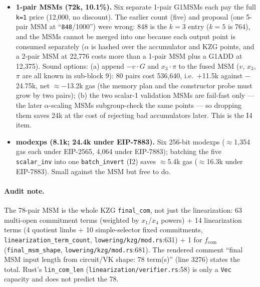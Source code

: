\begin{itemize}[leftmargin=1.4em,itemsep=2pt]
  \item \textbf{1-pair MSMs (72k, 10.1\%).} Six separate 1-pair
        G1MSMs each pay the full \texttt{k=1} price (12{,}000, no
        discount).  The earlier count (five) and
        proposal (one 5-pair MSM at ``\texttt{848}/1000'') were wrong:
        848 is the $k{=}3$ entry ($k{=}5$ is 764), and the MSMs cannot be
        merged into one because each output point is consumed
        separately ($\alpha$ is hashed over the accumulator and KZG
        points, and a 2-pair MSM at 22{,}776 costs more than a 1-pair MSM
        plus a G1ADD at 12{,}375). Sound options: (a) append $-v\cdot G$
        and $x_3\cdot\pi$ to the fused MSM ($v$, $x_3$, $\pi$ are all known
        in sub-block 9): 80 pairs cost 536{,}640, i.e.\ $+$11.5k against
        $-$24.75k, net $\approx -$13.2k gas (the memory plan and the
        constructor probe must grow by two pairs); (b) the two scalar-1
        validation MSMs are fail-fast only --- the later $\alpha$-scaling
        MSMs subgroup-check the same points --- so dropping them saves 24k
        at the cost of rejecting bad accumulators later. This is the I4
        item. 
  \item \textbf{modexps (8.1k; 24.4k under EIP-7883).} Six 256-bit
        modexps ($\approx$1{,}354 gas each under EIP-2565, 4{,}064 under
        EIP-7883); batching the five \texttt{scalar\_inv} into one
        \texttt{batch\_invert} (I2) saves $\approx$5.4k gas
        ($\approx$16.3k under EIP-7883). Small against the MSM but free
        to do. 
\end{itemize}

\paragraph{Audit note.} The 78-pair MSM is the whole KZG
\texttt{final\_com}, not just the linearization: 63 multi-open
commitment terms (weighted by $x_1$/$x_4$ powers) + 14 linearization
terms (4 quotient limbs + 10 simple-selector fixed commitments,
\texttt{linearization\_\allowbreak{}term\_\allowbreak{}count}, \texttt{lowering/\allowbreak{}kzg/\allowbreak{}mod.rs}:631) + 1 for
$f_\text{com}$ (\texttt{final\_msm\_shape}, \texttt{lowering/\allowbreak{}kzg/\allowbreak{}mod.rs}:681).
The rendered comment ``final MSM input length from circuit/VK shape: 78
term(s)'' (line 3276) states the total. Rust's
\texttt{lin\_com\_len} (\texttt{linearization/\allowbreak{}verifier.rs}:58) is only a
\texttt{Vec} capacity and does not predict the 78.

